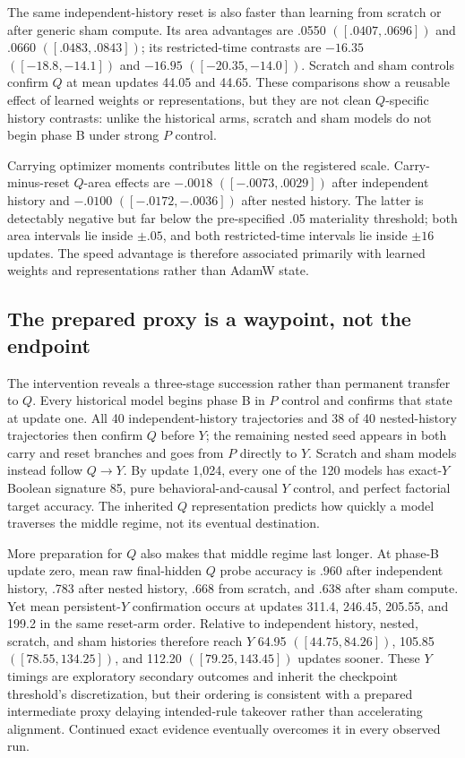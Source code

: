 \documentclass[11pt,a4paper]{article}
\begin{document}
The same independent-history reset is also faster than learning from scratch or after generic sham compute. Its area advantages are .0550 $([.0407,.0696])$ and .0660 $([.0483,.0843])$; its restricted-time contrasts are $-16.35$ $([-18.8,-14.1])$ and $-16.95$ $([-20.35,-14.0])$. Scratch and sham controls confirm $Q$ at mean updates 44.05 and 44.65. These comparisons show a reusable effect of learned weights or representations, but they are not clean $Q$-specific history contrasts: unlike the historical arms, scratch and sham models do not begin phase B under strong $P$ control.

Carrying optimizer moments contributes little on the registered scale. Carry-minus-reset $Q$-area effects are $-.0018$ $([-.0073,.0029])$ after independent history and $-.0100$ $([-.0172,-.0036])$ after nested history. The latter is detectably negative but far below the pre-specified .05 materiality threshold; both area intervals lie inside $\pm.05$, and both restricted-time intervals lie inside $\pm16$ updates. The speed advantage is therefore associated primarily with learned weights and representations rather than AdamW state.

\subsection*{The prepared proxy is a waypoint, not the endpoint}

The intervention reveals a three-stage succession rather than permanent transfer to $Q$. Every historical model begins phase B in $P$ control and confirms that state at update one. All 40 independent-history trajectories and 38 of 40 nested-history trajectories then confirm $Q$ before $Y$; the remaining nested seed appears in both carry and reset branches and goes from $P$ directly to $Y$. Scratch and sham models instead follow $Q\mathbin{\to}Y$. By update 1,024, every one of the 120 models has exact-$Y$ Boolean signature 85, pure behavioral-and-causal $Y$ control, and perfect factorial target accuracy. The inherited $Q$ representation predicts how quickly a model traverses the middle regime, not its eventual destination.

More preparation for $Q$ also makes that middle regime last longer. At phase-B update zero, mean raw final-hidden $Q$ probe accuracy is .960 after independent history, .783 after nested history, .668 from scratch, and .638 after sham compute. Yet mean persistent-$Y$ confirmation occurs at updates 311.4, 246.45, 205.55, and 199.2 in the same reset-arm order. Relative to independent history, nested, scratch, and sham histories therefore reach $Y$ 64.95 $([44.75,84.26])$, 105.85 $([78.55,134.25])$, and 112.20 $([79.25,143.45])$ updates sooner. These $Y$ timings are exploratory secondary outcomes and inherit the checkpoint threshold's discretization, but their ordering is consistent with a prepared intermediate proxy delaying intended-rule takeover rather than accelerating alignment. Continued exact evidence eventually overcomes it in every observed run.
\end{document}
